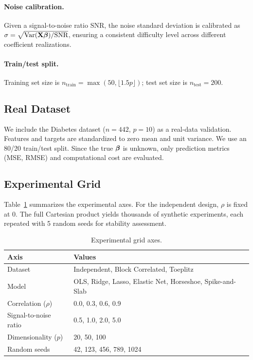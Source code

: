 \paragraph{Noise calibration.}
Given a signal-to-noise ratio $\text{SNR}$, the noise standard deviation is calibrated as $\sigma = \sqrt{\operatorname{Var}(\mathbf{X} \boldsymbol{\beta}) / \text{SNR}}$, ensuring a consistent difficulty level across different coefficient realizations.

\paragraph{Train/test split.}
Training set size is $n_{\text{train}} = \max(50, \lfloor 1.5p \rfloor)$; test set size is $n_{\text{test}} = 200$.

\subsection{Real Dataset}

We include the Diabetes dataset \citep{efron2004least} ($n = 442$, $p = 10$) as a real-data validation.
Features and targets are standardized to zero mean and unit variance.
We use an 80/20 train/test split.
Since the true $\boldsymbol{\beta}$ is unknown, only prediction metrics (MSE, RMSE) and computational cost are evaluated.

\subsection{Experimental Grid}

Table~\ref{tab:grid} summarizes the experimental axes.
For the independent design, $\rho$ is fixed at 0.
The full Cartesian product yields thousands of synthetic experiments, each repeated with 5 random seeds for stability assessment.

\begin{table}[h]
\centering
\caption{Experimental grid axes.}
\label{tab:grid}
\begin{tabular}{ll}
\toprule
Axis & Values \\
\midrule
Dataset & Independent, Block Correlated, Toeplitz \\
Model & OLS, Ridge, Lasso, Elastic Net, Horseshoe, Spike-and-Slab \\
Correlation ($\rho$) & 0.0, 0.3, 0.6, 0.9 \\
Signal-to-noise ratio & 0.5, 1.0, 2.0, 5.0 \\
Dimensionality ($p$) & 20, 50, 100 \\
Random seeds & 42, 123, 456, 789, 1024 \\
\bottomrule
\end{tabular}
\end{table}

